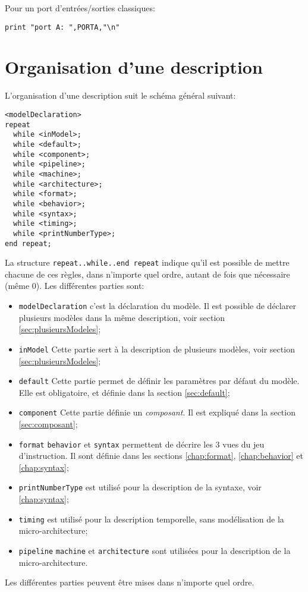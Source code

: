 Pour un port d'entrées/sorties classiques:
\begin{lstlisting}
print "port A: ",PORTA,"\n"
\end{lstlisting}

\section{Organisation d'une description}
L'organisation d'une description suit le schéma général suivant:
\begin{verbatim}
<modelDeclaration> 
repeat 
  while <inModel>; 
  while <default>; 
  while <component>; 
  while <pipeline>; 
  while <machine>; 
  while <architecture>; 
  while <format>; 
  while <behavior>; 
  while <syntax>; 
  while <timing>; 
  while <printNumberType>; 
end repeat;
\end{verbatim}
La structure \texttt{repeat..while..end repeat} indique qu'il est possible de mettre chacune de ces règles, dans n'importe quel ordre, autant de fois que nécessaire (même 0).
Les différentes parties sont:
\begin{itemize}
\item \texttt{modelDeclaration} c'est la déclaration du modèle. Il est possible de déclarer plusieurs modèles dans la même description, voir section \ref{sec:plusieursModeles};
\item \texttt{inModel} Cette partie sert à la description de plusieurs modèles, voir section \ref{sec:plusieursModeles};
\item \texttt{default} Cette partie permet de définir les paramètres par défaut du modèle. Elle est obligatoire, et définie dans la section \ref{sec:default};
\item \texttt{component} Cette partie définie un \emph{composant}. Il est expliqué dans la section \ref{sec:composant};
\item \texttt{format} \texttt{behavior} et \texttt{syntax} permettent de décrire les 3 vues du jeu d'instruction. Il sont définie dans les sections \ref{chap:format},  \ref{chap:behavior} et  \ref{chap:syntax};
\item \texttt{printNumberType} est utilisé pour la description de la syntaxe, voir \ref{chap:syntax};
\item \texttt{timing} est utilisé pour la description temporelle, sans modélisation de la micro-architecture;
\item \texttt{pipeline} \texttt{machine} et \texttt{architecture} sont utilisées pour la description de la micro-architecture.
\end{itemize}
Les différentes parties peuvent être mises dans n'importe quel ordre.

